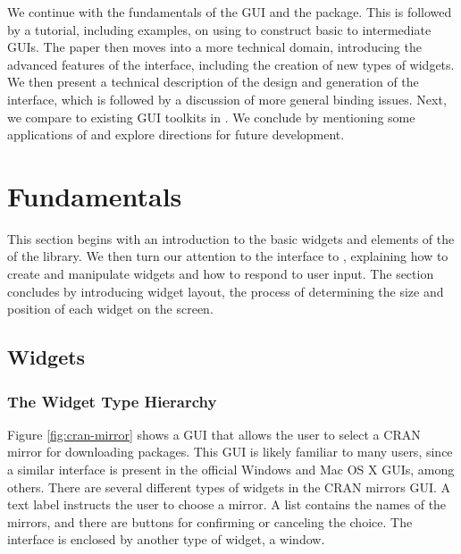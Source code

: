 \documentclass[article]{jss}
\begin{document}
We continue with the fundamentals of the  GUI and the
package. This is followed by a tutorial, including examples, on using 
 to construct basic to intermediate GUIs. The paper then
moves into 
a more technical domain, introducing the advanced features of the
interface, 
including the creation of new types of widgets. We then present a
technical 
description of the design and generation of
the interface, which is followed by a discussion of more general
binding issues.
Next, we compare  to existing GUI toolkits in .
We conclude
by mentioning some applications of  and explore directions
for future development.

\section{Fundamentals}

This section begins with an introduction to the basic widgets and
elements of the of the  library.
We then turn our attention to the  interface to 
, explaining how to create and manipulate widgets and how to
respond to
user input. The section concludes by introducing widget layout, the
process
of determining the size and position of each widget on the screen.


\subsection[GTK+ Widgets]{ Widgets}

\subsubsection{The Widget Type Hierarchy}

Figure \ref{fig:cran-mirror} shows a  GUI that allows the
user to
select a CRAN mirror for downloading  packages.
This GUI is likely familiar to many  users, since a
similar interface
is present in the official Windows and Mac OS X  GUIs,
among others.
There are several different types of widgets in the CRAN mirrors GUI.
A
text label instructs the user to choose a mirror.  A list contains the 
names of the mirrors, and there are buttons for confirming or
canceling the choice. 
The interface is enclosed by another type of widget, a window. 
\end{document}
